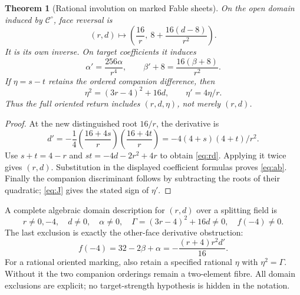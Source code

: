 \documentclass[11pt]{article}
\newtheorem{theorem}{Theorem}[section]
\theoremstyle{remark}\newtheorem{remark}[theorem]{Remark}
\begin{document}
\begin{theorem}[Rational involution on marked Fable sheets]
On the open domain induced by $\mathcal C^\circ$, face reversal is
\begin{equation}\label{eq:rd}
 (r,d)\longmapsto
 \left(\frac{16}{r},\ 8+\frac{16(d-8)}{r^2}\right).
\end{equation}
It is its own inverse. On target coefficients it induces
\begin{equation}\label{eq:ab}
 \alpha' =\frac{256\alpha}{r^4},\qquad
 \beta'+8=\frac{16(\beta+8)}{r^2}.
\end{equation}
If $\eta=s-t$ retains the ordered companion difference, then
\[
 \eta^2=(3r-4)^2+16d,\qquad \eta'=4\eta/r.
\]
Thus the full oriented return includes $(r,d,\eta)$, not merely $(r,d)$.
\end{theorem}
\begin{proof}
At the new distinguished root $16/r$, the derivative is
\[
 d'=-\frac14\left(\frac{16+4s}{r}\right)
                 \left(\frac{16+4t}{r}\right)
    =-4(4+s)(4+t)/r^2.
\]
Use $s+t=4-r$ and $st=-4d-2r^2+4r$ to obtain \eqref{eq:rd}. Applying it twice gives $(r,d)$. Substitution in the displayed coefficient formulas proves \eqref{eq:ab}. Finally the companion discriminant follows by subtracting the roots of their quadratic; \eqref{eq:J} gives the stated sign of $\eta'$.
\end{proof}

A complete algebraic domain description for $(r,d)$ over a splitting field is
\[
 r\ne0,-4,\quad d\ne0,\quad
 \alpha\ne0,\quad
 \Gamma=(3r-4)^2+16d\ne0,\quad f(-4)\ne0.
\]
The last exclusion is exactly the other-face derivative obstruction:
\[
 f(-4)=32-2\beta+\alpha
      =-\frac{(r+4)r^2d'}{16}.
\]
For a rational oriented marking, also retain a specified rational $\eta$ with $\eta^2=\Gamma$. Without it the two companion orderings remain a two-element fibre. All domain exclusions are explicit; no target-strength hypothesis is hidden in the notation.
\end{document}
